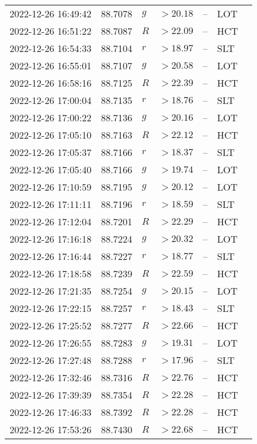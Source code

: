 \documentclass{nature_plusfigure}
\begin{document}
\begin{supplement}
\begin{center}
\begin{longtable}{lllllll}
2022-12-26 16:49:42 & 88.7078 & $g$ & $>20.18$ & -- & LOT &  \\ 
2022-12-26 16:51:22 & 88.7087 & $R$ & $>22.09$ & -- & HCT &  \\ 
2022-12-26 16:54:33 & 88.7104 & $r$ & $>18.97$ & -- & SLT &  \\ 
2022-12-26 16:55:01 & 88.7107 & $g$ & $>20.58$ & -- & LOT &  \\ 
2022-12-26 16:58:16 & 88.7125 & $R$ & $>22.39$ & -- & HCT &  \\ 
2022-12-26 17:00:04 & 88.7135 & $r$ & $>18.76$ & -- & SLT &  \\ 
2022-12-26 17:00:22 & 88.7136 & $g$ & $>20.16$ & -- & LOT &  \\ 
2022-12-26 17:05:10 & 88.7163 & $R$ & $>22.12$ & -- & HCT &  \\ 
2022-12-26 17:05:37 & 88.7166 & $r$ & $>18.37$ & -- & SLT &  \\ 
2022-12-26 17:05:40 & 88.7166 & $g$ & $>19.74$ & -- & LOT &  \\ 
2022-12-26 17:10:59 & 88.7195 & $g$ & $>20.12$ & -- & LOT &  \\ 
2022-12-26 17:11:11 & 88.7196 & $r$ & $>18.59$ & -- & SLT &  \\ 
2022-12-26 17:12:04 & 88.7201 & $R$ & $>22.29$ & -- & HCT &  \\ 
2022-12-26 17:16:18 & 88.7224 & $g$ & $>20.32$ & -- & LOT &  \\ 
2022-12-26 17:16:44 & 88.7227 & $r$ & $>18.77$ & -- & SLT &  \\ 
2022-12-26 17:18:58 & 88.7239 & $R$ & $>22.59$ & -- & HCT &  \\ 
2022-12-26 17:21:35 & 88.7254 & $g$ & $>20.15$ & -- & LOT &  \\ 
2022-12-26 17:22:15 & 88.7257 & $r$ & $>18.43$ & -- & SLT &  \\ 
2022-12-26 17:25:52 & 88.7277 & $R$ & $>22.66$ & -- & HCT &  \\ 
2022-12-26 17:26:55 & 88.7283 & $g$ & $>19.31$ & -- & LOT &  \\ 
2022-12-26 17:27:48 & 88.7288 & $r$ & $>17.96$ & -- & SLT &  \\ 
2022-12-26 17:32:46 & 88.7316 & $R$ & $>22.76$ & -- & HCT &  \\ 
2022-12-26 17:39:39 & 88.7354 & $R$ & $>22.28$ & -- & HCT &  \\ 
2022-12-26 17:46:33 & 88.7392 & $R$ & $>22.28$ & -- & HCT &  \\ 
2022-12-26 17:53:26 & 88.7430 & $R$ & $>22.68$ & -- & HCT &  \\ 

\end{longtable}
\end{center}
\end{supplement}
\end{document}
